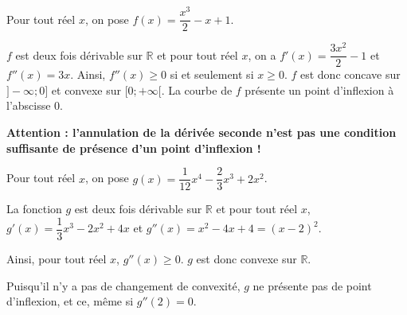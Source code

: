 \documentclass[11pt,fleqn, openany]{book} %
\begin{document}
\begin{example}Pour tout réel $x$, on pose $f(x)=\dfrac{x^3}{2}-x+1$. 

\begin{minipage}{0.7\linewidth}
$f$ est deux fois dérivable sur $\mathbb{R}$ et pour tout réel $x$, on a $f'(x)=\dfrac{3x^2}{2}-1$ et $f''(x)=3x$.
\vskip5pt
Ainsi, $f''(x) \geqslant 0$ si et seulement si $x\geqslant 0$.
\vskip5pt
$f$ est donc concave sur $]-\infty ;0]$ et convexe sur $[0;+\infty[$.
\vskip5pt
La courbe de $f$ présente un point d'inflexion à l'abscisse 0.
\end{minipage}\hfill\begin{minipage}{0.25\linewidth}
\end{minipage}

\end{example}

\textbf{Attention : l'annulation de la dérivée seconde n'est pas une condition suffisante de présence d'un point d'inflexion !}


\begin{example}Pour tout réel $x$, on pose $g(x)=\dfrac{1}{12}x^4-\dfrac{2}{3}x^3+2x^2$. 

\begin{minipage}{0.75\linewidth}
La fonction $g$ est deux fois dérivable sur $\mathbb{R}$ et pour tout réel $x$, \\$g'(x)=\dfrac{1}{3}x^3-2x^2+4x$ et $g''(x)=x^2-4x+4=(x-2)^2$.

Ainsi, pour tout réel $x$, $g''(x)\geqslant 0$. $g$ est donc convexe sur $\mathbb{R}$. 

Puisqu'il n'y a pas de changement de convexité, $g$ ne présente pas de point d'inflexion, et ce, même si $g''(2)=0$.
\end{minipage}\hfill\begin{minipage}{0.2\linewidth}
\end{minipage}

\end{example}
\end{document}
